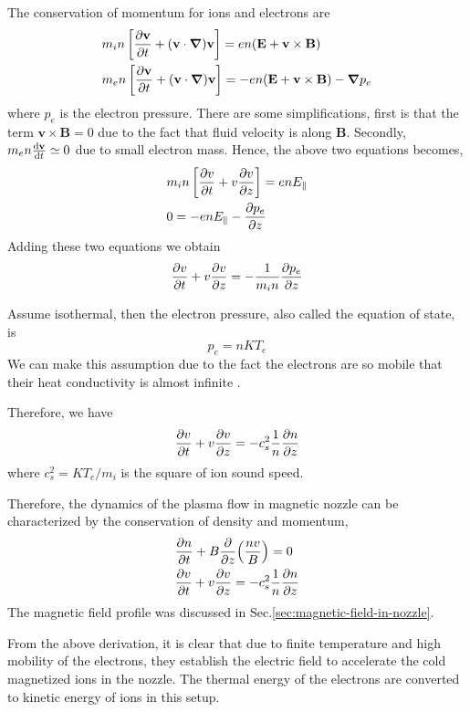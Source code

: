The conservation of momentum for ions and electrons are
\begin{align}
	 & m_in\left[\pdv{\mathbf{v}}{t} + (\mathbf{v}\cdot\grad)\mathbf{v}\right] = en(\mathbf{E}+\mathbf{v}\times\mathbf{B})                \\
	 & m_en\left[\pdv{\mathbf{v}}{t} + (\mathbf{v}\cdot\grad)\mathbf{v}\right]  = -en(\mathbf{E}+\mathbf{v}\times\mathbf{B}) - \grad{p_e}
\end{align}
where $p_e$ is the electron pressure. There are some simplifications, first is that the term $\mathbf{v\times B} = 0$ due to the fact that fluid velocity is along $\mathbf{B}$. Secondly, $m_en\dv{\mathbf{v}}{t} \simeq 0$ due to small electron mass. Hence, the above two equations becomes,
\begin{align}
	 & m_in\left[\pdv{v}{t} + v\pdv{v}{z}\right] = enE_\parallel \\
	 & 0 = -enE_\parallel - \pdv{p_e}{z}
\end{align}
Adding these two equations we obtain
\begin{equation}
	\pdv{v}{t} + v\pdv{v}{z} = -\frac{1}{m_in}\pdv{p_e}{z}
\end{equation}

Assume isothermal, then the electron pressure, also called the equation of state, is
\begin{equation} \label{eq:eos}
	p_e = nKT_e
\end{equation}
We can make this assumption due to the fact the electrons are so mobile that their heat conductivity is almost infinite \cite{chen_introduction_2016}.

Therefore, we have
\begin{equation}
	\pdv{v}{t} + v\pdv{v}{z} = -c_s^2\frac{1}{n}\pdv{n}{z}
\end{equation}
where $c_s^2 = KT_e/m_i$ is the square of ion sound speed.

Therefore, the dynamics of the plasma flow in magnetic nozzle can be characterized by the conservation of density and momentum,
\begin{align*}
	 & \pdv{n}{t} + B\pdv{z}(\frac{nv}{B}) = 0                \\
	 & \pdv{v}{t} + v\pdv{v}{z} = -c_s^2\frac{1}{n}\pdv{n}{z}
\end{align*}
The magnetic field profile was discussed in Sec.\ref{sec:magnetic-field-in-nozzle}.

From the above derivation, it is clear that due to finite temperature and high mobility of the electrons, they establish the electric field to accelerate the cold magnetized ions in the nozzle. The thermal energy of the electrons are converted to kinetic energy of ions in this setup.

